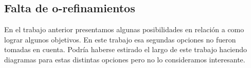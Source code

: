 \subsection{Falta de o-refinamientos}

En el trabajo anterior presentamos algunas posibilidades en relación a como lograr algunos objetivos. En este trabajo esa segundas opciones no fueron tomadas en cuenta. Podría haberse estirado el largo de este trabajo haciendo diagramas para estas distintas opciones pero no lo consideramos interesante. 

